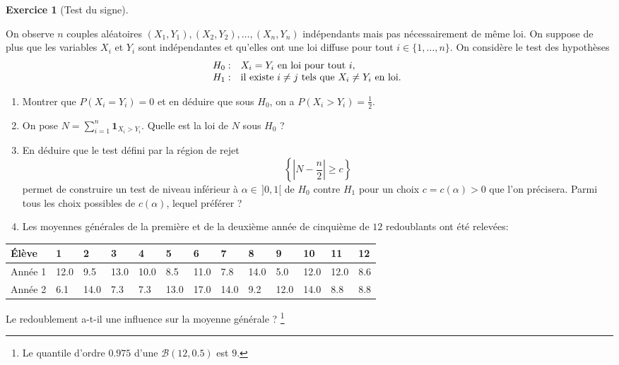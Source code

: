 \documentclass[
  10,
  letterpaper,
  DIV=11,
  numbers=noendperiod]{scrreport}
\providecommand{\tightlist}{%
  \setlength{\itemsep}{0pt}\setlength{\parskip}{0pt}}\usepackage{longtable,booktabs,array}
\theoremstyle{plain}
\theoremstyle{definition}
\newtheorem{exercise}{Exercice}[chapter]
\theoremstyle{plain}
\theoremstyle{definition}
\theoremstyle{definition}
\theoremstyle{plain}
\theoremstyle{remark}
\begin{document}
\begin{exercise}[Test du
signe]\protect\hypertarget{exr-testsigne}{}\label{exr-testsigne}

On observe \(n\) couples aléatoires
\((X_1,Y_1), (X_2,Y_2), \dots, (X_n,Y_n)\) indépendants mais pas
nécessairement de même loi. On suppose de plus que les variables \(X_i\)
et \(Y_i\) sont indépendantes et qu'elles ont une loi diffuse pour tout
\(i\in\{1,\dots,n\}\). On considère le test des hypothèses \[
\begin{array}{@{}cl}
H_0: &\text{$X_i=Y_i$ en loi pour tout $i$}, \\
H_1: & \text{il existe $i\not=j$ tels que $X_i\not=Y_i$ en loi}.
\end{array}
\]

\begin{enumerate}
\def\labelenumi{\arabic{enumi}.}
\tightlist
\item
  Montrer que \(P\left(X_i=Y_i\right)=0\) et en déduire que sous
  \(H_0\), on a \(P\left(X_i > Y_i\right) = \frac{1}{2}.\)
\item
  On pose \(N = \sum_{i = 1}^n \mathbf{1}_{X_i>Y_i}.\) Quelle est la loi
  de \(N\) sous \(H_0\) ?
\item
  En déduire que le test défini par la région de rejet
  \[\left\{\left|N-\frac{n}{2}\right| \geq c\right\}\] permet de
  construire un test de niveau inférieur à \(\alpha \in \,]0,1[\) de
  \(H_0\) contre \(H_1\) pour un choix \(c=c(\alpha) >0\) que l'on
  précisera. Parmi tous les choix possibles de \(c(\alpha)\), lequel
  préférer ?
\item
  Les moyennes générales de la première et de la deuxième année de
  cinquième de \(12\) redoublants ont été relevées:
\end{enumerate}

\begin{longtable}[]{@{}lllllllllllll@{}}
\toprule\noalign{}
Élève & 1 & 2 & 3 & 4 & 5 & 6 & 7 & 8 & 9 & 10 & 11 & 12 \\
\midrule\noalign{}
\endhead
\bottomrule\noalign{}
\endlastfoot
Année 1 & 12.0 & 9.5 & 13.0 & 10.0 & 8.5 & 11.0 & 7.8 & 14.0 & 5.0 &
12.0 & 12.0 & 8.6 \\
Année 2 & 6.1 & 14.0 & 7.3 & 7.3 & 13.0 & 17.0 & 14.0 & 9.2 & 12.0 &
14.0 & 8.8 & 8.8 \\
\end{longtable}

Le redoublement a-t-il une influence sur la moyenne générale ?
\footnote{Le quantile d'ordre \(0.975\) d'une \(\mathscr{B}(12,0.5)\)
  est \(9\).}

\end{exercise}
\end{document}
